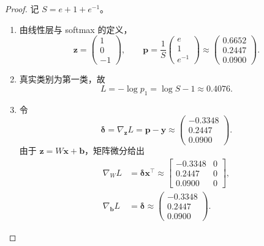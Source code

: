 \begin{proof}
    记 $S=e+1+e^{-1}$。
    \begin{enumerate}
        \item 由线性层与 softmax 的定义，
        \[
            \bm{z}=\boxed{\begin{pmatrix}1\\0\\-1\end{pmatrix}},
            \qquad
            \bm{p}=\frac1S\begin{pmatrix}e\\1\\e^{-1}\end{pmatrix}
            \approx\boxed{\begin{pmatrix}0.6652\\0.2447\\0.0900\end{pmatrix}}.
        \]
        \item 真实类别为第一类，故
        \[
            L=-\log p_1
             =\log S-1
             \approx\boxed{0.4076}.
        \]
        \item 令
        \[
            \bm{\delta}=\nabla_{\bm{z}}L
            =\bm{p}-\bm{y}
            \approx\begin{pmatrix}-0.3348\\0.2447\\0.0900\end{pmatrix}.
        \]
        由于 $\bm{z}=W\bm{x}+\bm{b}$，矩阵微分给出
        \[
        \begin{aligned}
            \nabla_WL
            &=\bm{\delta}\bm{x}^\top
             \approx\boxed{\begin{bmatrix}
                -0.3348&0\\
                0.2447&0\\
                0.0900&0
             \end{bmatrix}},\\
            \nabla_{\bm{b}}L
            &=\bm{\delta}
             \approx\boxed{\begin{pmatrix}-0.3348\\0.2447\\0.0900\end{pmatrix}}.
        \end{aligned}
        \]
    \end{enumerate}
\end{proof}
